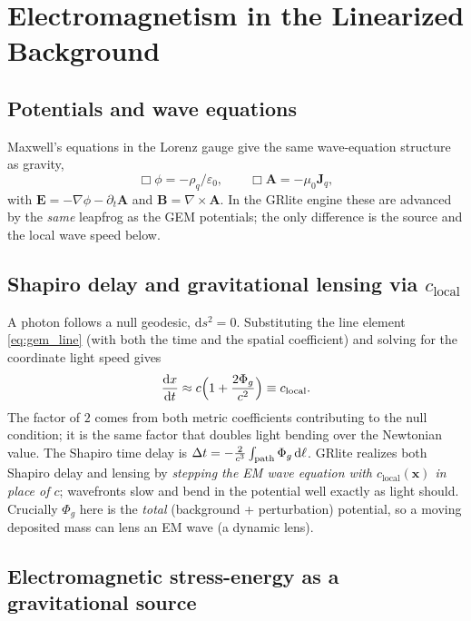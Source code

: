 \documentclass[11pt]{article}
\newcommand{\Phig}{\Phi_g}                 %
\newcommand{\vv}[1]{\mathbf{#1}}           %
\newcommand{\dd}{\mathrm{d}}               %
\newcommand{\clocal}{c_{\mathrm{local}}}
\begin{document}
\section{Electromagnetism in the Linearized Background}
\label{sec:em}

\subsection{Potentials and wave equations}

Maxwell's equations in the Lorenz gauge give the same wave-equation structure as
gravity,
\begin{equation}
  \Box\phi = -\rho_q/\varepsilon_0, \qquad \Box\vv{A} = -\mu_0\vv{J}_q,
\end{equation}
with $\vv{E}=-\nabla\phi-\partial_t\vv{A}$ and $\vv{B}=\nabla\times\vv{A}$.  In
the GRlite engine these are advanced by the \emph{same} leapfrog as the GEM
potentials; the only difference is the source and the local wave speed below.

\subsection{Shapiro delay and gravitational lensing via \texorpdfstring{$\clocal$}{c\_local}}
\label{sec:shapiro}

A photon follows a null geodesic, $\dd s^2=0$.  Substituting the line element
\eqref{eq:gem_line} (with both the time and the spatial coefficient) and solving
for the coordinate light speed gives
\begin{equation}
\label{eq:clocal}
  \frac{\dd x}{\dd t} \approx c\Bigl(1 + \frac{2\Phig}{c^2}\Bigr) \equiv \clocal .
\end{equation}
The factor of $2$ comes from both metric coefficients contributing to the null
condition; it is the same factor that doubles light bending over the Newtonian
value.  The Shapiro time delay is $\Delta t = -\tfrac{2}{c^3}\int_{\rm
path}\Phig\,\dd\ell$.  GRlite realizes both Shapiro delay and lensing by
\emph{stepping the EM wave equation with $\clocal(\vv{x})$ in place of $c$};
wavefronts slow and bend in the potential well exactly as light should.
Crucially $\Phig$ here is the \emph{total} (background + perturbation) potential,
so a moving deposited mass can lens an EM wave (a dynamic lens).

\subsection{Electromagnetic stress-energy as a gravitational source}
\label{sec:energy}
\end{document}
